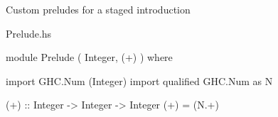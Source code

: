 \begin{frame}[fragile]

{\large
Custom preludes for a staged introduction
}
\nl

\begin{block}{Prelude.hs}
\begin{haskellcode}
module Prelude
  ( Integer, (+)
  )
where

import GHC.Num (Integer)
import qualified GHC.Num as N

(+) :: Integer -> Integer -> Integer
(+) = (N.+)
\end{haskellcode}
\end{block}
\end{frame}




